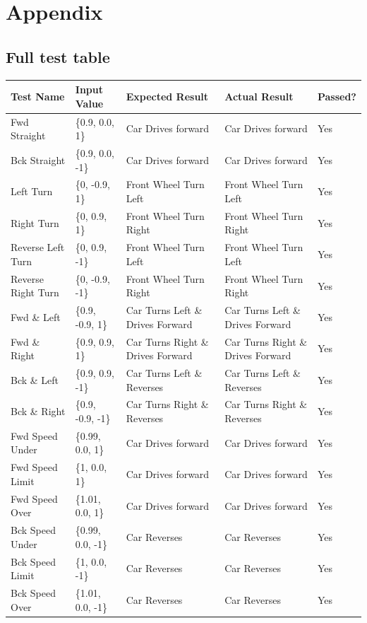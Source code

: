 \chapter{Appendix}

\section{Full test table}

\begin{table}[ht]
\centering
\begin{tabular}{lllll}
\toprule
\textbf{Test Name} & \textbf{Input Value} & \textbf{Expected Result} & \textbf{Actual Result} & \textbf{Passed?} \\
\midrule

Fwd Straight & \{0.9, 0.0, 1\} & Car Drives forward & Car Drives forward & Yes \\
Bck Straight & \{0.9, 0.0, -1\} & Car Drives forward & Car Drives forward & Yes \\
Left Turn & \{0, -0.9, 1\} & Front Wheel Turn Left & Front Wheel Turn Left & Yes \\
Right Turn & \{0, 0.9, 1\} & Front Wheel Turn Right & Front Wheel Turn Right & Yes \\
Reverse Left Turn & \{0, 0.9, -1\} & Front Wheel Turn Left & Front Wheel Turn Left & Yes \\
Reverse Right Turn & \{0, -0.9, -1\} & Front Wheel Turn Right & Front Wheel Turn Right & Yes \\
Fwd \& Left & \{0.9, -0.9, 1\} & Car Turns Left \& Drives Forward & Car Turns Left \& Drives Forward & Yes \\
Fwd \& Right & \{0.9, 0.9, 1\} & Car Turns Right \& Drives Forward & Car Turns Right \& Drives Forward & Yes \\
Bck \& Left & \{0.9, 0.9, -1\} & Car Turns Left \& Reverses & Car Turns Left \& Reverses & Yes \\
Bck \& Right & \{0.9, -0.9, -1\} & Car Turns Right \& Reverses & Car Turns Right \& Reverses & Yes \\

Fwd Speed Under & \{0.99, 0.0, 1\} & Car Drives forward & Car Drives forward & Yes \\
Fwd Speed Limit & \{1, 0.0, 1\} & Car Drives forward & Car Drives forward & Yes \\
Fwd Speed Over & \{1.01, 0.0, 1\} & Car Drives forward & Car Drives forward & Yes \\
Bck Speed Under & \{0.99, 0.0, -1\} & Car Reverses & Car Reverses & Yes \\
Bck Speed Limit & \{1, 0.0, -1\} & Car Reverses & Car Reverses & Yes \\
Bck Speed Over & \{1.01, 0.0, -1\} & Car Reverses & Car Reverses & Yes \\


\end{tabular}
\end{table}
